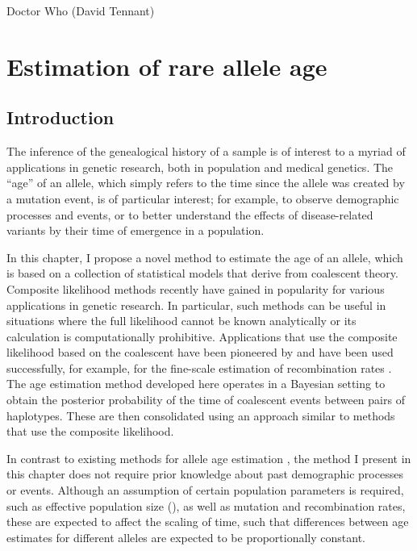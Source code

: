 
\glsresetall


{Doctor Who (David Tennant)}


{
\singlespacing
\chapter{Estimation of rare allele age}
\label{ch:rvage}
\minitoc
}


%
\section{Introduction}
%

The inference of the genealogical history of a sample is of interest to a myriad of applications in genetic research, both in population and medical genetics.
The ``age'' of an allele, which simply refers to the time since the allele was created by a mutation event, is of particular interest; for example, to observe demographic processes and events, or to better understand the effects of disease-related variants by their time of emergence in a population.

In this chapter, I propose a novel method to estimate the age of an allele, which is based on a collection of statistical models that derive from coalescent theory.
Composite likelihood methods recently have gained in popularity for various applications in genetic research.
In particular, such methods can be useful in situations where the full likelihood cannot be known analytically or its calculation is computationally prohibitive.
Applications that use the composite likelihood based on the coalescent have been pioneered by \citet{Hudson:2001vs} and have been used successfully, for example, for the fine-scale estimation of recombination rates \citep{McVean:2004ca,Myers:2005vi}.
The age estimation method developed here operates in a Bayesian setting to obtain the posterior probability of the time of coalescent events between pairs of haplotypes.
These are then consolidated using an approach similar to methods that use the composite likelihood.

In contrast to existing methods for allele age estimation \citep[\eg, see review by][]{Slatkin:2000us}, the method I present in this chapter does not require prior knowledge about past demographic processes or events.
Although an assumption of certain population parameters is required, such as effective population size (\Ne), as well as mutation and recombination rates, these are expected to affect the scaling of time, such that differences between age estimates for different alleles are expected to be proportionally constant.

